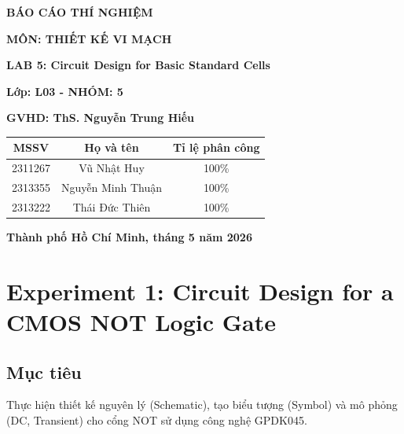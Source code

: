 \documentclass[12pt, a4paper, oneside]{article}
\begin{document}
\begin{titlepage}
\begin{center}
    \fontsize{18pt}{17pt}\selectfont 
    \textbf{BÁO CÁO THÍ NGHIỆM}

    \textbf{MÔN:  THIẾT KẾ VI MẠCH}
\end{center}
\begin{center}
    \fontsize{15pt}{17pt}\selectfont 
    \textbf{\textrm{LAB 5: Circuit Design for Basic Standard Cells }}
\end{center}

\begin{center}
    \vspace{15pt}
    \textbf{Lớp: L03 - NHÓM: 5}
    
    \textbf{GVHD: ThS. Nguyễn Trung Hiếu}
\end{center}

\vspace{10pt}

\begin{table}[h!]
\centering
\begin{tabular}{|c|c|c|}
\hline
\textbf{MSSV} & \textbf{Họ và tên} & \textbf{Tỉ lệ phân công} \\ \hline
2311267 & Vũ Nhật Huy & 100\% \\ \hline
2313355 & Nguyễn Minh Thuận & 100\% \\ \hline
2313222 & Thái Đức Thiên & 100\% \\ \hline
\end{tabular}
\end{table}
\vfill
\centerline{\bf Thành phố Hồ Chí Minh, tháng 5 năm 2026}

\vspace{1cm}
\end{titlepage}
\newpage
\tableofcontents
\newpage

\section{Experiment 1: Circuit Design for a CMOS NOT Logic Gate}

\subsection{Mục tiêu}
Thực hiện thiết kế nguyên lý (Schematic), tạo biểu tượng (Symbol) và mô phỏng (DC, Transient) cho cổng NOT sử dụng công nghệ GPDK045.
\end{document}
